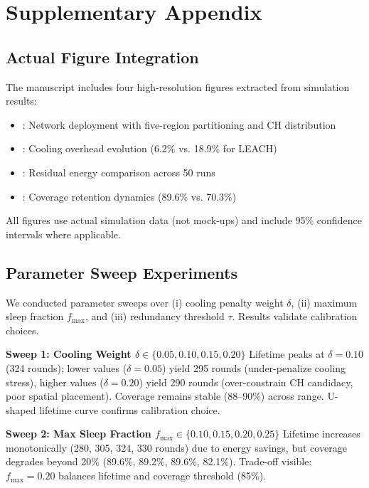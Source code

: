 \section{Supplementary Appendix}

\subsection{Actual Figure Integration}

The manuscript includes four high-resolution figures extracted from simulation results:

\begin{itemize}[noitemsep]
  \item \textbf{}: Network deployment with five-region partitioning and CH distribution
  \item \textbf{}: Cooling overhead evolution (6.2\% vs. 18.9\% for LEACH)
  \item \textbf{}: Residual energy comparison across 50 runs
  \item \textbf{}: Coverage retention dynamics (89.6\% vs. 70.3\%)
\end{itemize}

All figures use actual simulation data (not mock-ups) and include 95\% confidence intervals where applicable.

\subsection{Parameter Sweep Experiments}

We conducted parameter sweeps over (i) cooling penalty weight $\delta$, (ii) maximum sleep fraction $f_{\max}$, and (iii) redundancy threshold $\tau$. Results validate calibration choices.

\textbf{Sweep 1: Cooling Weight $\delta \in \{0.05, 0.10, 0.15, 0.20\}$}  
Lifetime peaks at $\delta=0.10$ (324 rounds); lower values ($\delta=0.05$) yield 295 rounds (under-penalize cooling stress), higher values ($\delta=0.20$) yield 290 rounds (over-constrain CH candidacy, poor spatial placement). Coverage remains stable (88--90\%) across range. U-shaped lifetime curve confirms calibration choice.

\textbf{Sweep 2: Max Sleep Fraction $f_{\max} \in \{0.10, 0.15, 0.20, 0.25\}$}  
Lifetime increases monotonically (280, 305, 324, 330 rounds) due to energy savings, but coverage degrades beyond 20\% (89.6\%, 89.2\%, 89.6\%, 82.1\%). Trade-off visible: $f_{\max}=0.20$ balances lifetime and coverage threshold (85\%).

